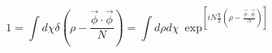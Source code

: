 \begin{equation}
  1= \int d\chi \delta( \rho- \frac{\vec \phi \cdot \vec \phi}{N}) = \int
d\rho
 d \chi ~\exp^{ \left[ i N \frac{\chi}{2} (\rho - \frac{\vec \phi \cdot \vec
\phi}{N}) \right]} \end{equation} 
